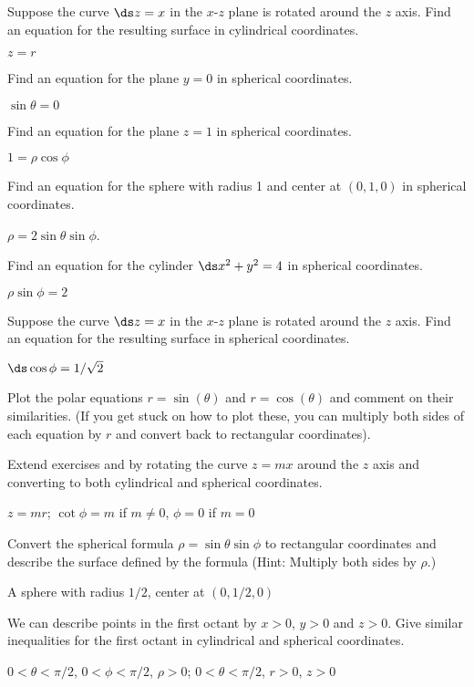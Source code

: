 \begin{exercises}
\exercise Suppose the curve $\ds z=x$ in the $x$-$z$ plane is
rotated around the $z$ axis. Find an equation for the resulting
surface in cylindrical coordinates.
\begin{answer} $z=r$
\end{answer}
\label{ex:rotate z=x z axis cylindrical}

\exercise Find an equation for the plane $y=0$ in
spherical coordinates.
\begin{answer} $\sin\theta=0$
\end{answer}

\exercise Find an equation for the plane $z=1$ in
spherical coordinates.
\begin{answer} $1=\rho\cos\phi$
\end{answer}

\exercise Find an equation for the sphere with radius 1 and center at
$(0,1,0)$ in spherical coordinates.
\begin{answer} $\rho=2\sin\theta\sin\phi$.
\end{answer}

\exercise Find an equation for the cylinder $\ds x^2+y^2=4$ in
spherical coordinates.
\begin{answer} $\rho\sin\phi=2$
\end{answer}

\exercise Suppose the curve $\ds z=x$ in the $x$-$z$ plane is
rotated around the $z$ axis. Find an equation for the resulting
surface in spherical coordinates.
\begin{answer} $\ds \cos\phi=1/\sqrt2$
\end{answer}
\label{ex:rotate z=x z axis spherical}

\exercise Plot the polar equations $r=\sin(\theta)$ and $r=\cos(\theta)$
and comment on their similarities.  (If you get stuck on how to plot
these, you can multiply both sides of each equation by $r$ and convert
back to rectangular coordinates).

\exercise Extend exercises  
and 
 by rotating the curve $z=mx$
around the $z$ axis and converting to both cylindrical and spherical
coordinates.
\begin{answer} $z=mr$; $\cot\phi=m$ if $m\neq0$, $\phi=0$ if $m=0$
\end{answer}

\exercise Convert the spherical formula $\rho=\sin \theta \sin \phi$ to
rectangular coordinates and describe the surface defined by the
formula (Hint: Multiply both sides by $\rho$.)
\begin{answer} A sphere with radius $1/2$, center at $(0,1/2,0)$
\end{answer}

\exercise We can describe points in the first octant by $x >0$, $y>0$ and
$z>0$.  Give similar inequalities for the first octant in cylindrical
and spherical coordinates.
\begin{answer} $0<\theta<\pi/2$, $0<\phi<\pi/2$, $\rho>0$;
$0<\theta<\pi/2$, $r>0$, $z>0$
\end{answer}

\end{exercises}
